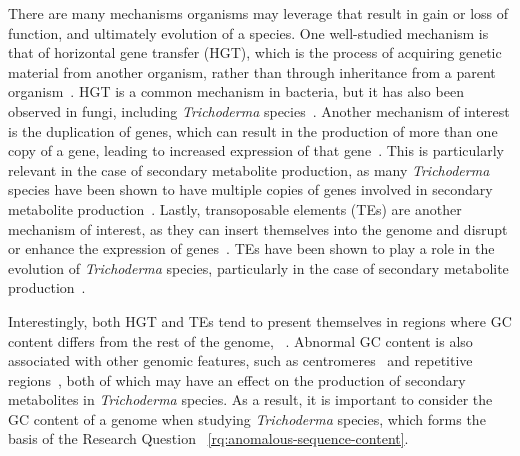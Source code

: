 There are many mechanisms organisms may leverage that result in gain or loss of function, and ultimately evolution of a species. One well-studied mechanism is that of horizontal gene transfer (HGT), which is the process of acquiring genetic material from another organism, rather than through inheritance from a parent organism~\cite{goncalves2024}. HGT is a common mechanism in bacteria, but it has also been observed in fungi, including \textit{Trichoderma} species~\cite{goncalves2024}. Another mechanism of interest is the duplication of genes, which can result in the production of more than one copy of a gene, leading to increased expression of that gene~\cite{goncalves2024}. This is particularly relevant in the case of secondary metabolite production, as many \textit{Trichoderma} species have been shown to have multiple copies of genes involved in secondary metabolite production~\cite{Mukherjee2012}. Lastly, transoposable elements (TEs) are another mechanism of interest, as they can insert themselves into the genome and disrupt or enhance the expression of genes~\cite{goncalves2024}. TEs have been shown to play a role in the evolution of \textit{Trichoderma} species, particularly in the case of secondary metabolite production~\cite{goncalves2024}. 

Interestingly, both HGT and TEs tend to present themselves in regions where GC content differs from the rest of the genome, ~\cite{goncalves2024}. Abnormal GC content is also associated with other genomic features, such as centromeres~\cite{plohl2014a} and repetitive regions~\cite{winter2018}, both of which may have an effect on the production of secondary metabolites in \textit{Trichoderma} species. As a result, it is important to consider the GC content of a genome when studying \textit{Trichoderma} species, which forms the basis of the Research Question ~\ref{rq:anomalous-sequence-content}.


